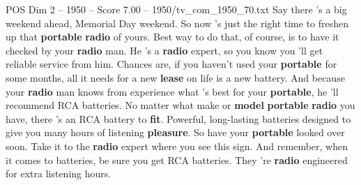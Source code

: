 \begin{textsample}{POS Dim 2 – 1950 – Score 7.00 – 1950/tv\_com\_1950\_70.txt}  \label{ex:f2_pos_002}
Say there 's a big weekend ahead, Memorial Day weekend.
So now 's just the right time to freshen up that \textbf{portable} \textbf{radio} of yours.
Best way to do that, of course, is to have it checked by your \textbf{radio} man.
He 's a \textbf{radio} expert, so you know you 'll get reliable service from him.
Chances are, if you haven't used your \textbf{portable} for some months, all it needs for a new \textbf{lease} on life is a new battery.
And because your \textbf{radio} man knows from experience what 's best for your \textbf{portable}, he 'll recommend RCA batteries.
No matter what make or \textbf{model} \textbf{portable} \textbf{radio} you have, there 's an RCA battery to \textbf{fit}.
Powerful, long-lasting batteries designed to give you many hours of listening \textbf{pleasure}.
So have your \textbf{portable} looked over soon.
Take it to the \textbf{radio} expert where you see this sign.
And remember, when it comes to batteries, be sure you get RCA batteries.
They 're \textbf{radio} engineered for extra listening hours.

\end{textsample}
